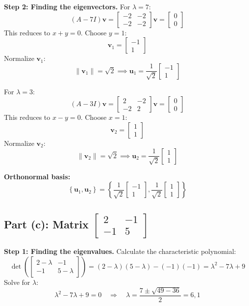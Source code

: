 \documentclass[12pt]{article}
\begin{document}
\textbf{Step 2: Finding the eigenvectors.}
For \(\lambda = 7\):
\[
(A - 7I)\mathbf{v} = \begin{bmatrix} -2 & -2 \\ -2 & -2 \end{bmatrix}\mathbf{v} = \begin{bmatrix} 0 \\ 0 \end{bmatrix}
\]
This reduces to \(x + y = 0\). Choose \(y = 1\):
\[
\mathbf{v}_1 = \begin{bmatrix} -1 \\ 1 \end{bmatrix}
\]
Normalize \(\mathbf{v}_1\):
\[
\|\mathbf{v}_1\| = \sqrt{2} \implies \mathbf{u}_1 = \frac{1}{\sqrt{2}}\begin{bmatrix} -1 \\ 1 \end{bmatrix}
\]

For \(\lambda = 3\):
\[
(A - 3I)\mathbf{v} = \begin{bmatrix} 2 & -2 \\ -2 & 2 \end{bmatrix}\mathbf{v} = \begin{bmatrix} 0 \\ 0 \end{bmatrix}
\]
This reduces to \(x - y = 0\). Choose \(x = 1\):
\[
\mathbf{v}_2 = \begin{bmatrix} 1 \\ 1 \end{bmatrix}
\]
Normalize \(\mathbf{v}_2\):
\[
\|\mathbf{v}_2\| = \sqrt{2} \implies \mathbf{u}_2 = \frac{1}{\sqrt{2}}\begin{bmatrix} 1 \\ 1 \end{bmatrix}
\]

\textbf{Orthonormal basis:}
\[
\left\{ \mathbf{u}_1, \mathbf{u}_2 \right\} = \left\{ \frac{1}{\sqrt{2}}\begin{bmatrix} -1 \\ 1 \end{bmatrix}, \frac{1}{\sqrt{2}}\begin{bmatrix} 1 \\ 1 \end{bmatrix} \right\}
\]

\subsection*{Part (c): Matrix \( \begin{bmatrix} 2 & -1 \\ -1 & 5 \end{bmatrix} \)}
\textbf{Step 1: Finding the eigenvalues.}
Calculate the characteristic polynomial:
\[
\det\left(\begin{bmatrix} 2-\lambda & -1 \\ -1 & 5-\lambda \end{bmatrix}\right) = (2-\lambda)(5-\lambda) - (-1)(-1) = \lambda^2 - 7\lambda + 9
\]
Solve for \(\lambda\):
\[
\lambda^2 - 7\lambda + 9 = 0 \quad \Rightarrow \quad \lambda = \frac{7 \pm \sqrt{49 - 36}}{2} = 6, 1
\]
\end{document}
